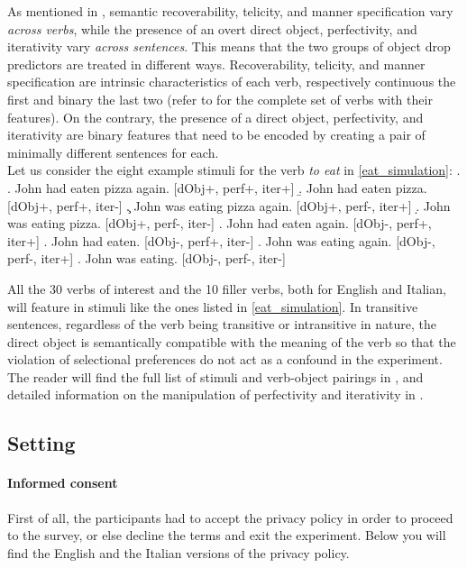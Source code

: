 As mentioned in , semantic recoverability, telicity, and manner specification vary \textit{across verbs}, while the presence of an overt direct object, perfectivity, and iterativity vary \textit{across sentences}. This means that the two groups of object drop predictors are treated in different ways. Recoverability, telicity, and manner specification are intrinsic characteristics of each verb, respectively continuous the first and binary the last two (refer to  for the complete set of verbs with their features). On the contrary, the presence of a direct object, perfectivity, and iterativity are binary features that need to be encoded by creating a pair of minimally different sentences for each.\\
Let us consider the eight example stimuli for the verb \textit{to eat} in \ref{eat_simulation}:
\ex. \label{eat_simulation} \a. John had eaten pizza again. \hfill {\small [dObj+, perf+, iter+]}
\b. John had eaten pizza. \hfill {\small [dObj+, perf+, iter-]}
\c. John was eating pizza again. \hfill {\small [dObj+, perf-, iter+]}
\d. John was eating pizza. \hfill {\small [dObj+, perf-, iter-]}
\e. John had eaten again. \hfill {\small [dObj-, perf+, iter+]}
\e. John had eaten. \hfill {\small [dObj-, perf+, iter-]}
\e. John was eating again. \hfill {\small [dObj-, perf-, iter+]}
\e. John was eating. \hfill {\small [dObj-, perf-, iter-]}

All the 30 verbs of interest and the 10 filler verbs, both for English and Italian, will feature in stimuli like the ones listed in \ref{eat_simulation}. In transitive sentences, regardless of the verb being transitive or intransitive in nature, the direct object is semantically compatible with the meaning of the verb so that the violation of selectional preferences do not act as a confound in the experiment. The reader will find the full list of stimuli and verb-object pairings in , and detailed information on the manipulation of perfectivity and iterativity in .


\subsection{Setting} 
 
 \paragraph{Informed consent} First of all, the participants had to accept the privacy policy in order to proceed to the survey, or else decline the terms and exit the experiment. Below you will find the English and the Italian versions of the privacy policy.

